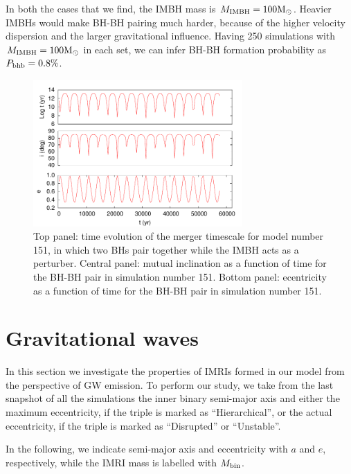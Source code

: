 \documentclass[useAMS,usenatbib]{mn2e}
\newcommand{\Ms}{{\rm M}_\odot}
\newcommand{\ibh}{{\rm IMBH}}
\begin{document}
In both the cases that we find, the IMBH mass is $M_\ibh=100\Ms$. Heavier IMBHs would make BH-BH pairing much harder, because of the higher velocity dispersion and the larger gravitational influence. Having 250 simulations with $M_\ibh=100\Ms$ in each set, we can infer BH-BH formation probability as $P_{\rm bhb} = 0.8\%$.

\begin{figure}
\centering 
\includegraphics[width=8cm]{kozai_151}
\caption{Top panel: time evolution of the merger timescale for model number 151, in which two BHs pair together while the IMBH acts as a perturber. Central panel: mutual inclination as a function of time for the BH-BH pair in simulation number 151. Bottom panel: ecentricity as a function of time for the BH-BH pair in simulation number 151.}
\label{F9}
\end{figure}

\section{Gravitational waves}

In this section we investigate the properties of IMRIs formed in our model from the perspective of GW emission. To perform our study, we take from the last snapshot of all the simulations the inner binary semi-major axis and either the maximum eccentricity, if the triple is marked as ``Hierarchical'', or the actual eccentricity, if the triple is marked as ``Disrupted'' or ``Unstable''.

In the following, we indicate semi-major axis and eccentricity with $a$ and $e$, respectively, while the IMRI mass is labelled with $M_{\rm bin}$.
\end{document}
